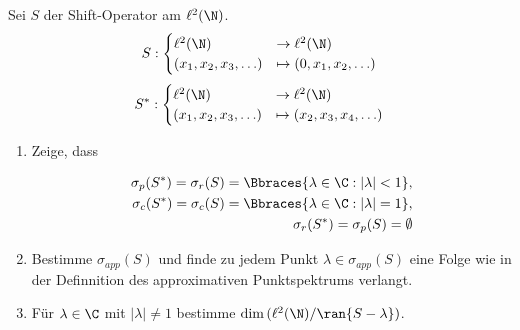 \begin{exercise}[23/1]

Sei $S$ der Shift-Operator am $\ell^2(\N)$.
\begin{align*}
  S:
  \begin{cases}
    \ell^2(\N)              & \to     \ell^2(\N) \\
    (x_1, x_2, x_3, \ldots) & \mapsto (0, x_1, x_2, \ldots)
  \end{cases}
\end{align*}
\begin{align*}
  S^*:
  \begin{cases}
    \ell^2(\N)             & \to     \ell^2(\N) \\
    (x_1, x_2, x_3, \ldots) & \mapsto (x_2, x_3, x_4, \ldots)
  \end{cases}
\end{align*}
\begin{enumerate}[label = (\alph*)]

  \item
  Zeige, dass

  \begin{align*}
    \sigma_p(S^\ast) = \sigma_r(S) = \Bbraces{\lambda \in \C: |\lambda| < 1}, \\
    \sigma_c(S^\ast) = \sigma_c(S) = \Bbraces{\lambda \in \C: |\lambda| = 1}, \\
    \sigma_r(S^\ast) = \sigma_p(S) = \emptyset
  \end{align*}

  \item
  Bestimme $\sigma_{app}(S)$ und finde zu jedem Punkt $\lambda \in \sigma_{app}(S)$ eine Folge wie in der Definnition des approximativen Punktspektrums verlangt.

  \item
  Für $\lambda \in \C$ mit $|\lambda| \neq 1$ bestimme $\dim{(\ell^2(\N) / \ran{S - \lambda})}$.

\end{enumerate}

\end{exercise}

